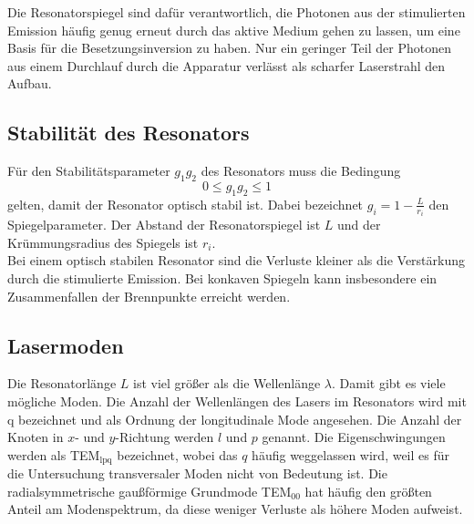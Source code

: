 Die Resonatorspiegel sind dafür verantwortlich, die Photonen aus der stimulierten Emission häufig genug erneut durch das aktive Medium gehen zu lassen, um eine Basis für die Besetzungsinversion zu haben. Nur ein geringer Teil der Photonen aus einem Durchlauf durch die Apparatur verlässt als scharfer Laserstrahl den Aufbau.

\subsection{Stabilität des Resonators}
\label{subsec:stabilitaetTheorie}
Für den Stabilitätsparameter $g_1 g_2$ des Resonators muss die Bedingung
\begin{equation}
  0 \le g_1 g_2 \le 1
  \label{eqn:stabilitaet}
\end{equation}
gelten, damit der Resonator optisch stabil ist. Dabei bezeichnet $g_i = 1 - \frac{L}{r_i}$ den Spiegelparameter. Der Abstand der Resonatorspiegel ist $L$ und der Krümmungsradius des Spiegels ist $r_i$.\\
Bei einem optisch stabilen Resonator sind die Verluste kleiner als die Verstärkung durch die stimulierte Emission. Bei konkaven Spiegeln kann insbesondere ein Zusammenfallen der Brennpunkte erreicht werden.

\subsection{Lasermoden}
\label{subsec:modenTheorie}
Die Resonatorlänge $L$ ist viel größer als die Wellenlänge $\lambda$. Damit gibt es viele mögliche Moden. Die Anzahl der Wellenlängen des Lasers im Resonators wird mit q bezeichnet und als Ordnung der longitudinale Mode angesehen. Die Anzahl der Knoten in $x$- und $y$-Richtung werden $l$ und $p$ genannt. Die Eigenschwingungen werden als TEM$_\mathrm{lpq}$ bezeichnet, wobei das $q$ häufig weggelassen wird, weil es für die Untersuchung transversaler Moden nicht von Bedeutung ist. Die radialsymmetrische gaußförmige Grundmode TEM$_{\mathrm{00}}$ hat häufig den größten Anteil am Modenspektrum, da diese weniger Verluste als höhere Moden aufweist.
